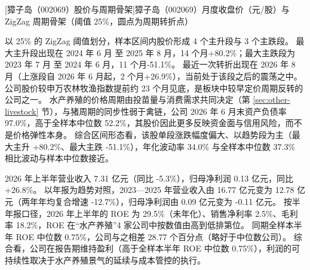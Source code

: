 \begin{center}
\begin{minipage}{\textwidth}\centering
{}

[獐子岛（002069）股价与周期骨架]{獐子岛（002069）月度收盘价（元/股）与 ZigZag 周期骨架（阈值 25\%，圆点为周期转折点）}
\end{minipage}
\end{center}

 以 25\% 的 ZigZag 阈值划分，样本区间内股价形成 4 个主升段与 3 个主跌段。 最大主升段出现在 2024 年 6 月 至 2025 年 8 月，14 个月+80.2\%；最大主跌段为 2023 年 7 月 至 2024 年 6 月，11 个月-51.1\%。 最近一次转折出现在 2026 年 8 月（上涨段自 2026 年 6 月起，2 个月+26.9\%），当前处于该段之后的震荡之中。 公司股价较申万农林牧渔指数提前约 23 个月见底，是板块中较早定价周期反转的公司之一。 水产养殖的价格周期由投苗量与消费需求共同决定（第 \ref{sec:other-livestock} 节），与猪周期的同步性弱于禽链，公司 2026 年 6 月末资产负债率 97.0\%，高于全样本中位数 52.2\%，其股价因此更多反映资金面与信用风险，而不是价格弹性本身。 综合区间形态看，该股单段涨跌幅度偏大、以趋势段为主（最大主升 +80.2\%、最大主跌 -51.1\%），年化波动率 34.0\% 与全样本中位数 37.3\% 相比波动与样本中位数接近。

 2026 年上半年营业收入 7.31 亿元（同比 -5.3\%），归母净利润 0.13 亿元，同比 +26.8\%。 以年报为趋势对照，2023---2025 年营业收入由 16.77 亿元变为 12.78 亿元（两年年均复合增速 -12.7\%），归母净利润由 0.09 亿元变为 -0.11 亿元。 按半年报口径，2026 年上半年的 ROE 为 29.5\%（未年化）、销售净利率 2.5\%、毛利率 18.2\%，ROE 在“水产养殖”4 家公司中按数值由高到低排第位。 同期全样本半年 ROE 中位数 0.75\%，公司与之相差 28.77 个百分点（略好于中位数公司）。 综合看，公司在报告期维持盈利（高于全样本半年 ROE 中位数 0.75\%），利润的可持续性取决于水产养殖景气的延续与成本管控的执行。

